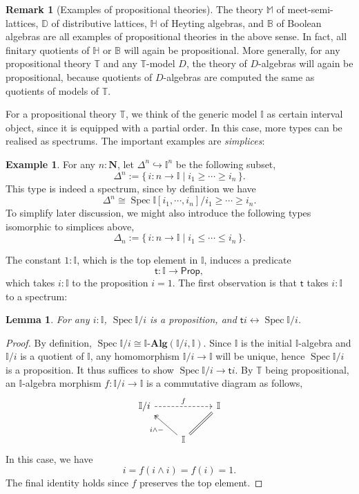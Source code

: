 \documentclass[12pt]{amsart}
\newtheorem{lemma}[theorem]{Lemma}
\theoremstyle{definition}
\newtheorem{example}[theorem]{Example}
\newtheorem{remark}[theorem]{Remark}
\newcommand{\mb}[1]{\mathbf{#1}}
\newcommand{\mbb}[1]{\mathbb{#1}}
\newcommand{\T}{\mbb T}
\newcommand{\I}{\mbb I}
\newcommand{\ms}[1]{\mathsf{#1}}
\newcommand{\alg}{\text{-}\mb{Alg}}
\newcommand{\scomp}[2]{\{\,#1\mid#2\,\}}
\newcommand{\hook}{\hookrightarrow}
\newcommand{\N}{\mb N}
\newcommand{\eq}{\leftrightarrow}
\newcommand{\pp}{\ms{Prop}}
\newcommand{\spec}{\operatorname{Spec}}
\begin{document}
\begin{remark}[Examples of propositional theories]
  The theory $\mbb M$ of meet-semi-lattices, $\mbb D$ of distributive lattices, $\mbb H$ of Heyting algebras, and $\mbb B$ of Boolean algebras are all examples of propositional theories in the above sense. In fact, all finitary quotients of $\mbb H$ or $\mbb B$ will again be propositional. More generally, for any propositional theory $\T$ and any $\T$-model $D$, the theory of $D$-algebras will again be propositional, because quotients of $D$-algebras are computed the same as quotients of models of $\T$.
\end{remark}

For a propositional theory $\T$, we think of the generic model $\I$ as certain interval object, since it is equipped with a partial order. In this case, more types can be realised as spectrums. The important examples are \emph{simplices}:

\begin{example}\label{exm:simplicesaffine}
  For any $n : \N$, let $\Delta^n \hook \I^n$ be the following subset,
  \[ \Delta^n := \scomp{i : n \to \I}{i_1 \ge \cdots \ge i_n}. \]
  This type is indeed a spectrum, since by definition we have
  \[ \Delta^n \cong \spec\I[i_1,\cdots,i_n]/i_1\ge\cdots\ge i_n. \]
  To simplify later discussion, we might also introduce the following types isomorphic to simplices above,
  \[ \Delta_n := \scomp{i : n \to \I}{i_1 \le \cdots \le i_n}. \]
\end{example}

The constant $1 : \I$, which is the top element in $\I$, induces a predicate
\[ \ms t : \I \to \pp, \]
which takes $i : \I$ to the proposition $i = 1$. The first observation is that $\ms t$ takes $i : \I$ to a spectrum:

\begin{lemma}\label{lem:openpropaffine}
  For any $i : \I$, $\spec\I/i$ is a proposition, and $\ms ti \eq \spec \I/i$.
\end{lemma}
\begin{proof}
  By definition, $\spec \I/i \cong \I\alg(\I/i,\I)$. Since $\I$ is the initial $\I$-algebra and $\I/i$ is a quotient of $\I$, any homomorphism $\I/i \to \I$ will be unique, hence $\spec\I/i$ is a proposition. It thus suffices to show $\spec\I/i \to \ms ti$. By $\T$ being propositional, an $\I$-algebra morphism $f : \I/i \to \I$ is a commutative diagram as follows,
  \[
  \begin{tikzcd}
    \I/i \ar[rr, dashed, "f"] & & \I \\ 
    & \I \ar[ul, two heads, "i \wedge -"] \ar[ur, equal]
  \end{tikzcd}
  \]
  In this case, we have
  \[ i = f(i \wedge i) = f(i) = 1. \]
  The final identity holds since $f$ preserves the top element. 
\end{proof}
\end{document}
